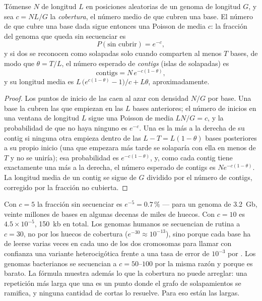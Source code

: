 \begin{theorem}\label{thm:b3:genomics:lander-waterman}
Tómense $N$  de longitud $L$ en posiciones aleatorias de un
genoma de longitud $G$, y sea $c = NL/G$ la \emph{cobertura}, el número
medio de  que cubren una base. El número de  que cubre
una base dada sigue entonces una Poisson de media $c$: la fracción del
genoma que queda sin secuenciar es
\[
P(\text{sin cubrir}) = e^{-c},
\]
y si dos  se reconocen como solapadas solo cuando comparten al
menos $T$ bases, de modo que $\theta = T/L$, el número esperado de
\emph{contigs} (islas de  solapadas) es
\[
\text{contigs} = N\,e^{-c(1-\theta)},
\]
y su longitud media es $L\,\bigl(e^{c(1-\theta)} - 1\bigr)/c + L\theta$,
aproximadamente.
\end{theorem}
\begin{proof}
Los puntos de inicio de las  caen al azar con densidad $N/G$ por
base. Una base la cubren las  que empiezan en las $L$ bases
anteriores; el número de inicios en una ventana de longitud $L$ sigue una
Poisson de media $LN/G
= c$, y la probabilidad de que no haya ninguno es $e^{-c}$. Una 
es la más a la derecha de su contig si ninguna otra empieza dentro de las
$L - T = L(1-\theta)$ bases posteriores a su propio inicio (una 
que empezara más tarde se solaparía con ella en menos de $T$ y no se
uniría); esa probabilidad es $e^{-c(1-\theta)}$, y, como cada contig
tiene exactamente una  más a la derecha, el número esperado de
contigs es $N e^{-c(1-\theta)}$. La longitud media de un contig se sigue
de $G$ dividido por el número de contigs, corregido por la fracción no
cubierta.
\end{proof}

\begin{example}\label{ex:b3:genomics:coverage}
Con $c = 5$ la fracción sin secuenciar es $e^{-5} = 0.7\,\%$ --- para un
genoma de \qty{3.2}{Gb}, veinte millones de bases en algunas decenas de
miles de huecos. Con $c = 10$ es $4.5\times 10^{-5}$, \qty{150}{kb} en
total. Los genomas humanos se secuencian de rutina a $c = 30$, no por los
huecos de cobertura ($e^{-30} \approx 10^{-13}$), sino porque cada base
ha de leerse varias veces en cada uno de los dos cromosomas para llamar
con confianza una variante heterocigótica frente a una tasa de error de
$10^{-3}$ por . Los genomas bacterianos se secuencian a
$c = 50$--$100$ por la misma razón y porque es barato. La fórmula
muestra además lo que la cobertura no puede arreglar: una repetición más
larga que una  es un punto donde el grafo de solapamientos se
ramifica, y ninguna cantidad de  cortas lo resuelve. Para eso
están las  largas.
\end{example}

